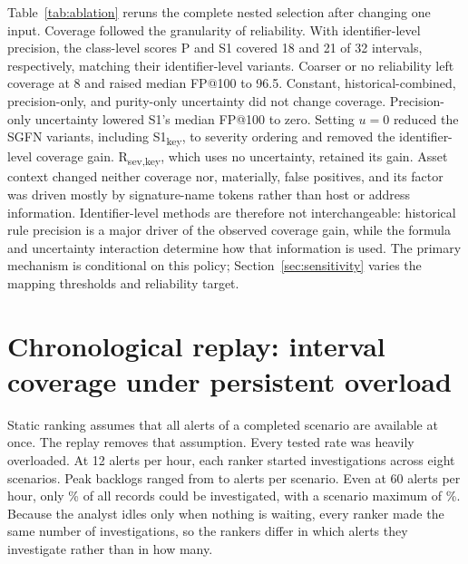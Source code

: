 \documentclass[pdflatex,sn-basic,Numbered]{sn-jnl}
\newcommand{\key}{\textsubscript{key}}
\newcommand{\Rsev}{R\textsubscript{sev,key}}
\begin{document}
Table~\ref{tab:ablation} reruns the complete nested selection after changing one input. Coverage followed the granularity of reliability. With identifier-level precision, the class-level scores P and S1 covered 18 and 21 of 32 intervals, respectively, matching their identifier-level variants. Coarser or no reliability left coverage at 8 and raised median FP@100 to 96.5. Constant, historical-combined, precision-only, and purity-only uncertainty did not change coverage. Precision-only uncertainty lowered S1's median FP@100 to zero. Setting $u=0$ reduced the SGFN variants, including S1\key, to severity ordering and removed the identifier-level coverage gain. \Rsev, which uses no uncertainty, retained its gain. Asset context changed neither coverage nor, materially, false positives, and its factor was driven mostly by signature-name tokens rather than host or address information. Identifier-level methods are therefore not interchangeable: historical rule precision is a major driver of the observed coverage gain, while the formula and uncertainty interaction determine how that information is used. The primary mechanism is conditional on this policy; Section~\ref{sec:sensitivity} varies the mapping thresholds and reliability target.

\begin{tableorg}[t]
\centering
\caption{Input ablations with full nested reselection: covered intervals at $k=100$ (of 32) / median FP@100.}
\label{tab:ablation}
\small
\unskip
\end{tableorg}

\begin{tableorg}[t]
\centering
\caption{Paired sign-flip tests with scenarios as units. Primary: prespecified family, Holm-adjusted. Exploratory: specified after results were seen, unadjusted. Differences are first minus second ranker; $+/-/0$ counts scenarios.}
\label{tab:tests}
\footnotesize
\unskip
\end{tableorg}

\section{Chronological replay: interval coverage under persistent overload}
\label{sec:replay}

Static ranking assumes that all alerts of a completed scenario are available at once. The replay removes that assumption. Every tested rate was heavily overloaded. At 12 alerts per hour, each ranker started \ReplayInvestigations{} investigations across eight scenarios. Peak backlogs ranged from \PeakBacklogMin{} to \PeakBacklogMax{} alerts per scenario. Even at 60 alerts per hour, only \ReplaySixtyShare\% of all records could be investigated, with a scenario maximum of \ReplaySixtyShareMax\%. Because the analyst idles only when nothing is waiting, every ranker made the same number of investigations, so the rankers differ in which alerts they investigate rather than in how many.
\end{document}
